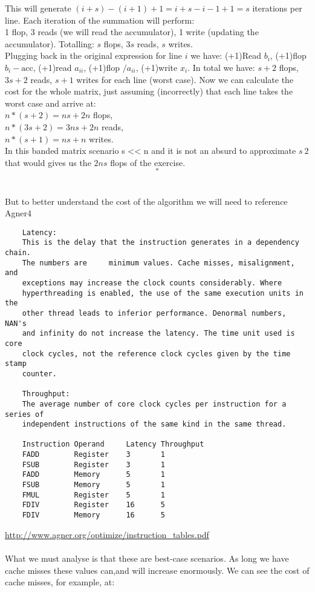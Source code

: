 \documentclass{article}
\begin{document}
	This will generate $(i+s) - (i+1) + 1 = i+s-i-1+1 = s$ iterations per line. Each iteration of the summation will perform:\\
	1 flop, 3 reads (we will read the accumulator), 1 write (updating the accumulator). Totalling:
	$s$ flops, $3s$ reads, $s$ writes.\\
	Plugging back in the original expression for line $i$ we have:
	(+1)Read $b_i$, (+1)flop $b_i - \text{acc}$, (+1)read $a_{ii}$, (+1)flop $/a_{ii}$, (+1)write $x_i$.
	In total we have:
	$s+2$ flops, $3s+2$ reads, $s+1$ writes for each line (worst case).
	Now we can calculate the cost for the whole matrix, just assuming (incorrectly) that each line takes the worst case and arrive at:\\
	$n*(s+2)=ns+2n$ flops,\\
	$n*(3s+2)=3ns+2n$ reads,\\
	$n*(s+1)=ns+n$ writes.\\
	In this banded matrix scenario s << n and it is not an absurd to approximate $s ~ 2$ that would gives us the $2ns$ flops of the exercise.
	$$\square$$
	\\\\
	But to better understand the cost of the algorithm we will need to reference Agner4
	\begin{verbatim}
	Latency:
	This is the delay that the instruction generates in a dependency chain.
	The numbers are 	minimum values. Cache misses, misalignment, and 
	exceptions may increase the clock counts considerably. Where 
	hyperthreading is enabled, the use of the same execution units in the 
	other thread leads to inferior performance. Denormal numbers, NAN's 
	and infinity do not increase the latency. The time unit used is core 
	clock cycles, not the reference	clock cycles given by the time stamp 
	counter.

	Throughput:
	The average number of core clock cycles per instruction for a series of 
	independent instructions of the same kind in the same thread.
	
	Instruction Operand 	Latency Throughput  
	FADD        Register    3       1
	FSUB        Register    3       1
	FADD        Memory      5       1
	FSUB        Memory      5       1	
	FMUL        Register    5       1
	FDIV        Register    16      5
	FDIV        Memory      16      5
	\end{verbatim}	
	\url{http://www.agner.org/optimize/instruction_tables.pdf}
	\\
	\\
	What we must analyse is that these are best-case scenarios. As long we have cache misses these values can,and will increase enormously. We can see the cost of cache misses, for example, at:\\
\end{document}
